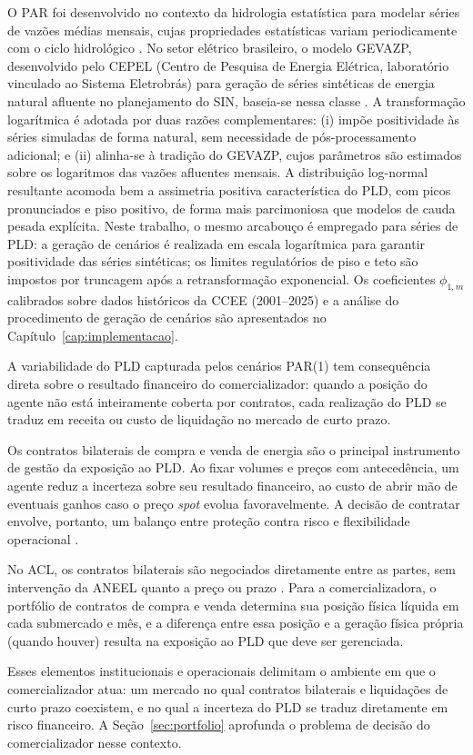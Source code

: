 O PAR foi desenvolvido no contexto da hidrologia estatística para modelar séries de vazões médias mensais, cujas propriedades estatísticas variam periodicamente com o ciclo hidrológico \cite{reis2013}. No setor elétrico brasileiro, o modelo GEVAZP, desenvolvido pelo CEPEL (Centro de Pesquisa de Energia Elétrica, laboratório vinculado ao Sistema Eletrobrás) para geração de séries sintéticas de energia natural afluente no planejamento do SIN, baseia-se nessa classe \cite{reis2013}. A transforma\c{c}\~ao logar\'itmica \'e adotada por duas raz\~oes complementares: (i) imp\~oe positividade \`as s\'eries simuladas de forma natural, sem necessidade de p\'os-processamento adicional; e (ii) alinha-se \`a tradi\c{c}\~ao do GEVAZP, cujos par\^ametros s\~ao estimados sobre os logaritmos das vaz\~oes afluentes mensais. A distribui\c{c}\~ao log-normal resultante acomoda bem a assimetria positiva caracter\'istica do PLD, com picos pronunciados e piso positivo, de forma mais parcimoniosa que modelos de cauda pesada expl\'icita. Neste trabalho, o mesmo arcabouço é empregado para séries de PLD: a geração de cenários é realizada em escala logarítmica para garantir positividade das séries sintéticas; os limites regulatórios de piso e teto são impostos por truncagem após a retransformação exponencial. Os coeficientes $\phi_{1,m}$ calibrados sobre dados históricos da CCEE (2001--2025) e a análise do procedimento de geração de cenários são apresentados no Capítulo~\ref{cap:implementacao}.

A variabilidade do PLD capturada pelos cenários PAR(1) tem consequência direta sobre o resultado financeiro do comercializador: quando a posição do agente não está inteiramente coberta por contratos, cada realização do PLD se traduz em receita ou custo de liquidação no mercado de curto prazo.

Os contratos bilaterais de compra e venda de energia são o principal instrumento de gestão da exposição ao PLD. Ao fixar volumes e preços com antecedência, um agente reduz a incerteza sobre seu resultado financeiro, ao custo de abrir mão de eventuais ganhos caso o preço \emph{spot} evolua favoravelmente. A decisão de contratar envolve, portanto, um balanço entre proteção contra risco e flexibilidade operacional \cite{bessa2006,pedrini2019}.

No ACL, os contratos bilaterais são negociados diretamente entre as partes, sem intervenção da ANEEL quanto a preço ou prazo \cite{ccee2024d}. Para a comercializadora, o portfólio de contratos de compra e venda determina sua posição física líquida em cada submercado e mês, e a diferença entre essa posição e a geração física própria (quando houver) resulta na exposição ao PLD que deve ser gerenciada.

Esses elementos institucionais e operacionais delimitam o ambiente em que o comercializador atua: um mercado no qual contratos bilaterais e liquidações de curto prazo coexistem, e no qual a incerteza do PLD se traduz diretamente em risco financeiro. A Seção~\ref{sec:portfolio} aprofunda o problema de decisão do comercializador nesse contexto.

